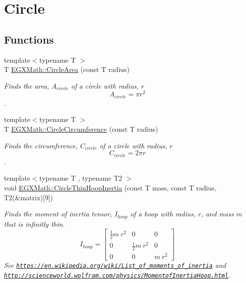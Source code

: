 \hypertarget{group___e_g_x_math-_geometry-2_d-_circle}{}\section{Circle}
\label{group___e_g_x_math-_geometry-2_d-_circle}
\subsection*{Functions}
\begin{DoxyCompactItemize}
\item 
{\footnotesize template$<$typename T $>$ }\\T \mbox{\hyperlink{group___e_g_x_math-_geometry-2_d-_circle_gabf5aadec991cc2bbf9d74fd83c46f40d}{E\+G\+X\+Math\+::\+Circle\+Area}} (const T radius)
\begin{DoxyCompactList}\small\item\em Finds the area, $A_{circle}$ of a circle with radius, $r$ \[ A_{circle}=\pi r^2 \]. \end{DoxyCompactList}\item 
{\footnotesize template$<$typename T $>$ }\\T \mbox{\hyperlink{group___e_g_x_math-_geometry-2_d-_circle_gadb55695b75a06a3f3534494eb767e18e}{E\+G\+X\+Math\+::\+Circle\+Circumference}} (const T radius)
\begin{DoxyCompactList}\small\item\em Finds the circumference, $C_{circle}$ of a circle with radius, $r$ \[ C_{circle}=2 \pi r \]. \end{DoxyCompactList}\item 
{\footnotesize template$<$typename T , typename T2 $>$ }\\void \mbox{\hyperlink{group___e_g_x_math-_geometry-2_d-_circle_ga2baf68984c03323ba47c9d9f00cf0559}{E\+G\+X\+Math\+::\+Circle\+Thin\+Hoop\+Inertia}} (const T mass, const T radius, T2(\&matrix)\mbox{[}9\mbox{]})
\begin{DoxyCompactList}\small\item\em Finds the moment of inertia tensor, $I_{hoop}$ of a hoop with radius, $r$, and mass $m$ that is infinitly thin. \[ I_{hoop}=\begin{bmatrix} \frac{1}{2}m\ r^2 & 0 & 0\\ 0 & \frac{1}{2}m\ r^2 & 0\\ 0 & 0 & m\ r^2 \end{bmatrix} \] See \href{https://en.wikipedia.org/wiki/List_of_moments_of_inertia}{\tt https\+://en.\+wikipedia.\+org/wiki/\+List\+\_\+of\+\_\+moments\+\_\+of\+\_\+inertia} and \href{http://scienceworld.wolfram.com/physics/MomentofInertiaHoop.html}{\tt http\+://scienceworld.\+wolfram.\+com/physics/\+Momentof\+Inertia\+Hoop.\+html}. \end{DoxyCompactList}\item 

\end{DoxyCompactItemize}
